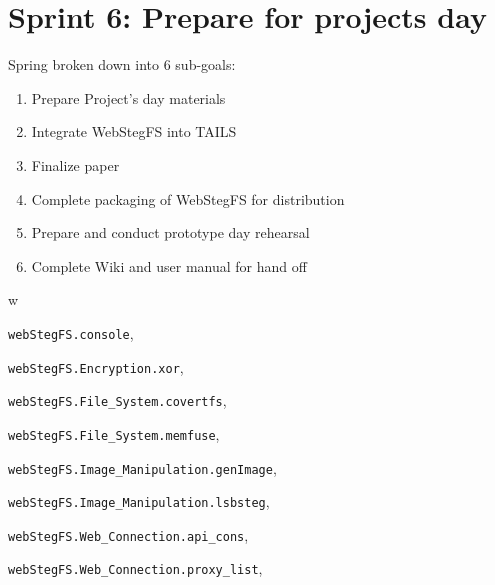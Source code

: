 \documentclass[letterpaper,12pt,openany,oneside]{sphinxmanual}
\begin{document}
\section{Sprint 6: Prepare for projects day}
\label{index:sprint-6-prepare-for-projects-day}
Spring broken down into 6 sub-goals:
\begin{enumerate}
\item {} 
Prepare Project's day materials

\item {} 
Integrate WebStegFS into TAILS

\item {} 
Finalize paper

\item {} 
Complete packaging of WebStegFS for distribution

\item {} 
Prepare and conduct prototype day rehearsal

\item {} 
Complete Wiki and user manual for hand off

\end{enumerate}


\renewcommand{\indexname}{Python Module Index}
\begin{theindex}
\def\bigletter#1{{\Large\sffamily#1}\nopagebreak\vspace{1mm}}
\bigletter{w}
\item {\texttt{webStegFS.console}}, \pageref{console:module-webStegFS.console}
\item {\texttt{webStegFS.Encryption.xor}}, \pageref{Encryption:module-webStegFS.Encryption.xor}
\item {\texttt{webStegFS.File\_System.covertfs}}, \pageref{File_System:module-webStegFS.File_System.covertfs}
\item {\texttt{webStegFS.File\_System.memfuse}}, \pageref{File_System:module-webStegFS.File_System.memfuse}
\item {\texttt{webStegFS.Image\_Manipulation.genImage}}, \pageref{Image_Manipulation:module-webStegFS.Image_Manipulation.genImage}
\item {\texttt{webStegFS.Image\_Manipulation.lsbsteg}}, \pageref{Image_Manipulation:module-webStegFS.Image_Manipulation.lsbsteg}
\item {\texttt{webStegFS.Web\_Connection.api\_cons}}, \pageref{Web_Connection:module-webStegFS.Web_Connection.api_cons}
\item {\texttt{webStegFS.Web\_Connection.proxy\_list}}, \pageref{Web_Connection:module-webStegFS.Web_Connection.proxy_list}
\end{theindex}

\renewcommand{\indexname}{Index}
\printindex
\end{document}
